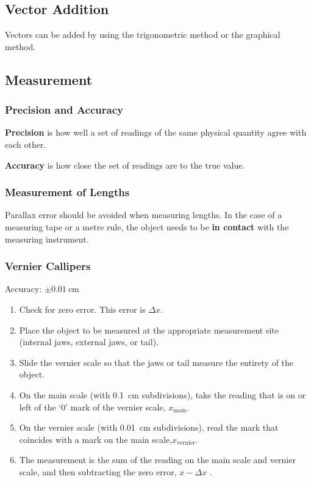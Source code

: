 \documentclass[../main.tex]{subfiles}
\begin{document}
		
		\subsection{Vector Addition}
		Vectors can be added by using the trigonometric method or the graphical method.
		
		\subsection{Measurement}
		\subsubsection{Precision and Accuracy}
		
		\textbf{Precision} is how well a set of readings of the same physical quantity agree with each other.
		
		\textbf{Accuracy} is how close the set of readings are to the true value.
		
		\subsubsection{Measurement of Lengths}
		Parallax error should be avoided when measuring lengths. In the case of a measuring tape or a metre rule, the object needs to be \textbf{in contact} with the measuring instrument.
		
		\subsubsection*{Vernier Callipers}
		Accuracy: \(\pm \SI{0.01}{\centi\meter}\)
		\begin{enumerate}
			\item Check for zero error. This error is \(\Delta x\).
			\item Place the object to be measured at the appropriate measurement site (internal jaws, external jaws, or tail).
			\item Slide the vernier scale so that the jaws or tail measure the entirety of the object.
			\item On the main scale (with \SI{0.1}{\centi\meter} subdivisions), take the reading that is on or left of the `0' mark of the vernier scale, \(x_\mathrm{main}\).
			\item On the vernier scale (with \SI{0.01}{\centi\meter} subdivisions), read the mark that coincides with a mark on the main scale,\(x_\mathrm{vernier}\).
			\item The measurement is the sum of the reading on the main scale and vernier scale, and then subtracting the zero error, \(x-\Delta x\) .
		\end{enumerate}
	
\end{document}

